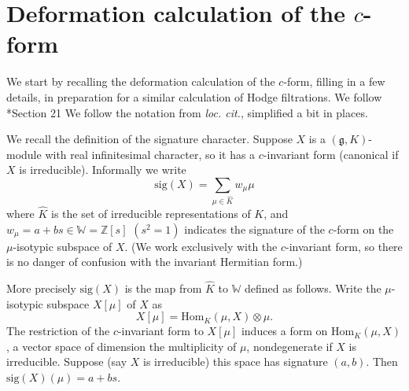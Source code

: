 \documentclass[12pt,leqno]{article}
\newtheorem{lemma}[equation]{Lemma}
\newcommand{\qed}{\hfill $\square$ \medskip}
\newenvironment{proof}[1][Proof]{\noindent\textbf{#1.} }{\qed}
\newcommand{\sig}{\text{sig}}
\newcommand{\hodge}{\text{hodge}}
\newcommand{\Hom}{\text{Hom}}
\newcommand{\Z}{\mathbb Z}
\newcommand{\W}{\mathbb W}
\renewcommand{\sec}[1]{\section{#1}
\renewcommand{\theequation}{\thesection.\arabic{equation}}
  \setcounter{equation}{0}}
\newcommand{\g}{\mathfrak g}
\newcommand{\Khat}{\widehat K}
\renewcommand{\sec}[1]{\section{#1}
\renewcommand{\theequation}{\thesection.\arabic{equation}}
  \setcounter{equation}{0}}
\begin{document}





\sec{Deformation calculation of the $c$-form}
\label{s:cform}
We start by recalling the deformation calculation of the $c$-form,
filling in a few details, in preparation for a similar calculation of
Hodge filtrations. We follow \cite{unitaryDual}*{Section 21}
We follow the notation from {\it
  loc. cit.}, simplified a bit in places.

We recall the definition of the signature character.  Suppose $X$ is a
$(\g,K)$-module with real infinitesimal character, so it has a
$c$-invariant form (canonical if $X$ is irreducible).
Informally we write
$$
\sig(X)=\sum_{\mu\in\Khat}w_\mu\mu
$$
where $\Khat$ is the set of irreducible representations of $K$,
and $w_\mu=a+bs\in \W=\Z[s]$ $(s^2=1)$ indicates the signature of the $c$-form on the
$\mu$-isotypic subspace of $X$.
(We work exclusively with the $c$-invariant
form, so there is no danger of confusion with the invariant Hermitian form.)

More precisely $\sig(X)$ is the map from $\Khat$ to $\W$ defined as follows.
Write the $\mu$-isotypic subspace $X[\mu]$ of $X$ as
$$
X[\mu]=\Hom_K(\mu,X)\otimes \mu.
$$
The restriction of the $c$-invariant form to
$X[\mu]$ induces a form on
$\Hom_K(\mu,X)$, a vector space of dimension the multiplicity
of $\mu$, nondegenerate if $X$ is irreducible.
Suppose (say $X$ is irreducible) this space has signature $(a,b)$.
Then $\sig(X)(\mu)=a+bs$.
\end{document}
